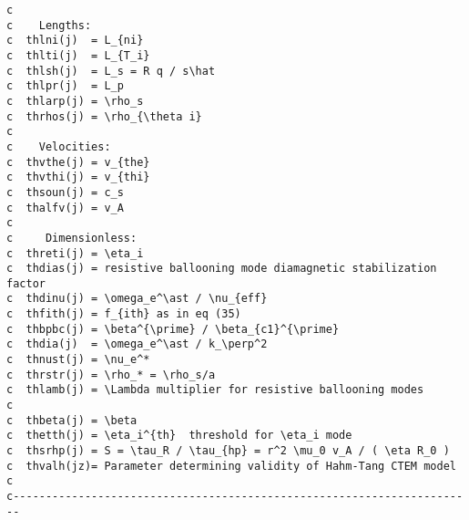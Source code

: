 \begin{verbatim}
c
c    Lengths:
c  thlni(j)  = L_{ni}
c  thlti(j)  = L_{T_i}
c  thlsh(j)  = L_s = R q / s\hat
c  thlpr(j)  = L_p
c  thlarp(j) = \rho_s
c  thrhos(j) = \rho_{\theta i}
c
c    Velocities:
c  thvthe(j) = v_{the}
c  thvthi(j) = v_{thi}
c  thsoun(j) = c_s
c  thalfv(j) = v_A
c
c     Dimensionless:
c  threti(j) = \eta_i
c  thdias(j) = resistive ballooning mode diamagnetic stabilization factor
c  thdinu(j) = \omega_e^\ast / \nu_{eff}
c  thfith(j) = f_{ith} as in eq (35)
c  thbpbc(j) = \beta^{\prime} / \beta_{c1}^{\prime}
c  thdia(j)  = \omega_e^\ast / k_\perp^2
c  thnust(j) = \nu_e^*
c  thrstr(j) = \rho_* = \rho_s/a
c  thlamb(j) = \Lambda multiplier for resistive ballooning modes
c
c  thbeta(j) = \beta
c  thetth(j) = \eta_i^{th}  threshold for \eta_i mode
c  thsrhp(j) = S = \tau_R / \tau_{hp} = r^2 \mu_0 v_A / ( \eta R_0 )
c  thvalh(jz)= Parameter determining validity of Hahm-Tang CTEM model
c
c-----------------------------------------------------------------------
\end{verbatim}

